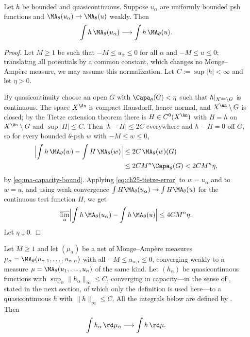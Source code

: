 \begin{lemma}
\label{lem:quasicontinuous-tests}
Let \(h\) be bounded and quasicontinuous. Suppose \(u_\alpha\) are uniformly
bounded psh functions and
\(\MA_\theta(u_\alpha)\to\MA_\theta(u)\) weakly. Then
\[
                    \int h\,\MA_\theta(u_\alpha)
                    \longrightarrow\int h\,\MA_\theta(u).
\]
\end{lemma}

\begin{proof}
Let \(M\geq1\) be such that \(-M\leq u_\alpha\leq0\) for all \(\alpha\) and
\(-M\leq u\leq0\); translating all potentials by a common constant, which
changes no Monge--Amp\`ere measure, we may assume this normalization.  Let
\(C:=\sup|h|<\infty\) and let \(\eta>0\).

By quasicontinuity choose an open \(G\) with
\(\Capa_\theta(G)<\eta\) such that \(h|_{X^{\An}\setminus G}\) is continuous.
The space \(X^{\An}\) is compact Hausdorff, hence normal, and
\(X^{\An}\setminus G\) is closed; by the Tietze extension theorem there is
\(H\in C^0(X^{\An})\) with \(H=h\) on \(X^{\An}\setminus G\) and
\(\sup|H|\leq C\).  Then \(|h-H|\leq2C\) everywhere and \(h-H=0\) off
\(G\), so for every bounded \(\theta\)-psh \(w\) with \(-M\leq w\leq0\),
\begin{equation}
\label{eq:ch25-tietze-error}
 \begin{aligned}
 \Bigl|\int h\,\MA_\theta(w)-\int H\,\MA_\theta(w)\Bigr|
 &\leq2C\,\MA_\theta(w)(G)\\
 &\leq2CM^n\Capa_\theta(G)<2CM^n\eta ,
 \end{aligned}
\end{equation}
by \eqref{eq:ma-capacity-bound}.  Applying
\eqref{eq:ch25-tietze-error} to \(w=u_\alpha\) and to \(w=u\), and using
weak convergence \(\int H\MA_\theta(u_\alpha)\to\int H\MA_\theta(u)\) for the
continuous test function \(H\), we get
\[
 \varlimsup_\alpha\Bigl|\int h\,\MA_\theta(u_\alpha)
   -\int h\,\MA_\theta(u)\Bigr|\leq4CM^n\eta .
\]
Let \(\eta\downarrow0\).
\end{proof}

\begin{lemma}
\label{lem:ch25-joint-limit}
Let \(M\geq1\) and let \((\mu_\alpha)\) be a net of Monge--Amp\`ere measures
\(\mu_\alpha=\MA_\theta(u_{\alpha,1},\ldots,u_{\alpha,n})\) with all
\(-M\leq u_{\alpha,i}\leq0\), converging weakly to a measure
\(\mu=\MA_\theta(u_1,\ldots,u_n)\) of the same kind.  Let \((h_\alpha)\) be
quasicontinuous functions with \(\sup_\alpha\|h_\alpha\|_\infty\leq C\),
converging in capacity---in the sense of
, stated in the next section, of which
only the definition is used here---to a quasicontinuous \(h\) with
\(\|h\|_\infty\leq C\).  All the integrals below are defined by
.  Then
\[
 \int h_\alpha\,\rd\mu_\alpha\longrightarrow\int h\,\rd\mu .
\]
\end{lemma}

